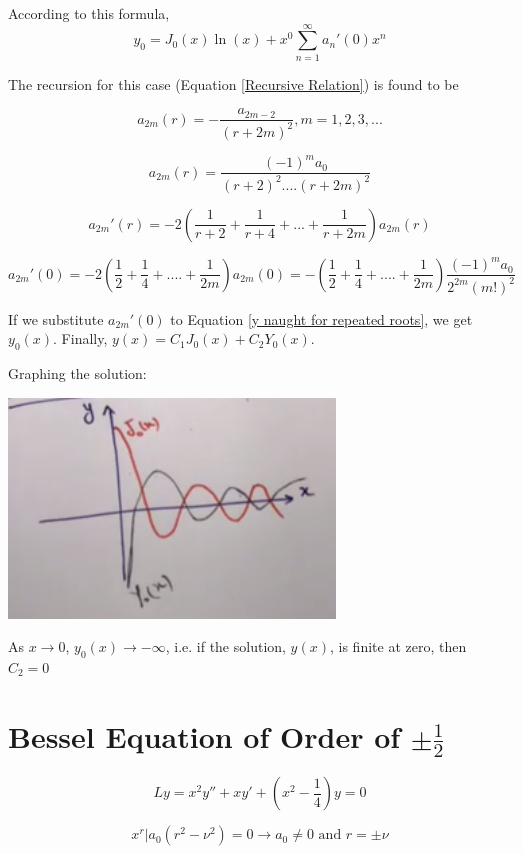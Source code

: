\documentclass{article}
\begin{document}
According to this formula, 
\begin{equation}
\label{y naught for repeated roots}
    y_0 = J_0 (x) \ln(x) + x^{0} \sum_{n = 1}^\infty a_n' (0) x^n
\end{equation}

The recursion for this case (Equation \ref{Recursive Relation}) is found to be 

$$a_{2m} (r) = - \frac{a_{2m-2}}{(r + 2m)^2}, m = 1,2,3,...$$

$$a_{2m}(r) = \frac{(-1)^m a_0}{(r+2)^2 .... (r + 2m)^2}$$

$$a_{2m}' (r) = -2 \left( \frac{1}{r+2} + \frac{1}{r+4} + ... + \frac{1}{r + 2m} \right) a_{2m} (r)$$

$$a_{2m}' (0) = -2 \left( \frac{1}{2} + \frac{1}{4} + .... + \frac{1}{2m} \right) a_{2m}(0) = - \left(\frac{1}{2} + \frac{1}{4} + .... + \frac{1}{2m} \right) \frac{(-1)^m a_0}{2^{2m} (m!)^2} $$


If we substitute $a_{2m}'(0)$ to Equation \ref{y naught for repeated roots}, we get $y_0 (x)$. Finally, $y(x) = C_1 J_0 (x) + C_2 Y_0 (x)$. 

Graphing the solution:

\includegraphics[width = 0.8 \textwidth]{image4.png}

As $x \to 0$, $y_0 (x) \to - \infty$, i.e. if the solution, $y(x)$, is finite at zero, then $C_2 = 0$

\section{Bessel Equation of Order of $\pm \frac{1}{2}$}

$$Ly = x^2 y'' + xy' + (x^2 - \frac{1}{4} )y = 0$$

$$x^r | a_0 (r^2 - \nu^2) = 0 \longrightarrow a_0 \neq 0 \text{ and } r = \pm \nu$$
\end{document}
